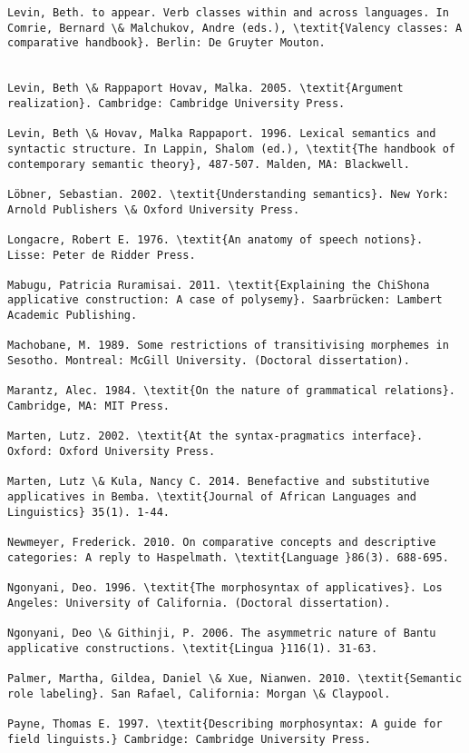 \documentclass[output=paper]{langsci/langscibook}
\begin{document}
\begin{verbatim}
Levin, Beth. to appear. Verb classes within and across languages. In Comrie, Bernard \& Malchukov, Andre (eds.), \textit{Valency classes: A comparative handbook}. Berlin: De Gruyter Mouton.


Levin, Beth \& Rappaport Hovav, Malka. 2005. \textit{Argument realization}. Cambridge: Cambridge University Press.

Levin, Beth \& Hovav, Malka Rappaport. 1996. Lexical semantics and syntactic structure. In Lappin, Shalom (ed.), \textit{The handbook of contemporary semantic theory}, 487-507. Malden, MA: Blackwell.

Löbner, Sebastian. 2002. \textit{Understanding semantics}. New York: Arnold Publishers \& Oxford University Press.

Longacre, Robert E. 1976. \textit{An anatomy of speech notions}. Lisse: Peter de Ridder Press.

Mabugu, Patricia Ruramisai. 2011. \textit{Explaining the ChiShona applicative construction: A case of polysemy}. Saarbrücken: Lambert Academic Publishing.

Machobane, M. 1989. Some restrictions of transitivising morphemes in Sesotho. Montreal: McGill University. (Doctoral dissertation).

Marantz, Alec. 1984. \textit{On the nature of grammatical relations}. Cambridge, MA: MIT Press.

Marten, Lutz. 2002. \textit{At the syntax-pragmatics interface}. Oxford: Oxford University Press.

Marten, Lutz \& Kula, Nancy C. 2014. Benefactive and substitutive applicatives in Bemba. \textit{Journal of African Languages and Linguistics} 35(1). 1-44.

Newmeyer, Frederick. 2010. On comparative concepts and descriptive categories: A reply to Haspelmath. \textit{Language }86(3). 688-695.

Ngonyani, Deo. 1996. \textit{The morphosyntax of applicatives}. Los Angeles: University of California. (Doctoral dissertation).

Ngonyani, Deo \& Githinji, P. 2006. The asymmetric nature of Bantu applicative constructions. \textit{Lingua }116(1). 31-63.

Palmer, Martha, Gildea, Daniel \& Xue, Nianwen. 2010. \textit{Semantic role labeling}. San Rafael, California: Morgan \& Claypool.

Payne, Thomas E. 1997. \textit{Describing morphosyntax: A guide for field linguists.} Cambridge: Cambridge University Press. 


\end{verbatim}
\end{document}
